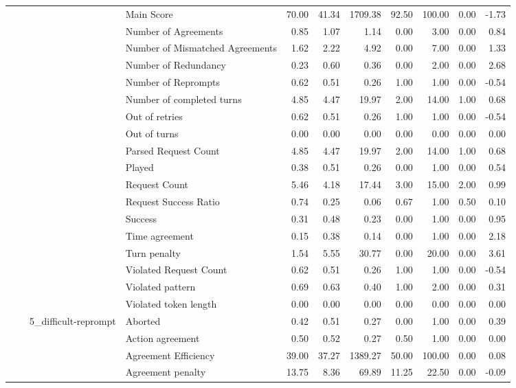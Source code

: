 \begin{tabular}{llllrrrrrrr}
 &  &  & Main Score & 70.00 & 41.34 & 1709.38 & 92.50 & 100.00 & 0.00 & -1.73 \\
 &  &  & Number of Agreements & 0.85 & 1.07 & 1.14 & 0.00 & 3.00 & 0.00 & 0.84 \\
 &  &  & Number of Mismatched Agreements & 1.62 & 2.22 & 4.92 & 0.00 & 7.00 & 0.00 & 1.33 \\
 &  &  & Number of Redundancy & 0.23 & 0.60 & 0.36 & 0.00 & 2.00 & 0.00 & 2.68 \\
 &  &  & Number of Reprompts & 0.62 & 0.51 & 0.26 & 1.00 & 1.00 & 0.00 & -0.54 \\
 &  &  & Number of completed turns & 4.85 & 4.47 & 19.97 & 2.00 & 14.00 & 1.00 & 0.68 \\
 &  &  & Out of retries & 0.62 & 0.51 & 0.26 & 1.00 & 1.00 & 0.00 & -0.54 \\
 &  &  & Out of turns & 0.00 & 0.00 & 0.00 & 0.00 & 0.00 & 0.00 & 0.00 \\
 &  &  & Parsed Request Count & 4.85 & 4.47 & 19.97 & 2.00 & 14.00 & 1.00 & 0.68 \\
 &  &  & Played & 0.38 & 0.51 & 0.26 & 0.00 & 1.00 & 0.00 & 0.54 \\
 &  &  & Request Count & 5.46 & 4.18 & 17.44 & 3.00 & 15.00 & 2.00 & 0.99 \\
 &  &  & Request Success Ratio & 0.74 & 0.25 & 0.06 & 0.67 & 1.00 & 0.50 & 0.10 \\
 &  &  & Success & 0.31 & 0.48 & 0.23 & 0.00 & 1.00 & 0.00 & 0.95 \\
 &  &  & Time agreement & 0.15 & 0.38 & 0.14 & 0.00 & 1.00 & 0.00 & 2.18 \\
 &  &  & Turn penalty & 1.54 & 5.55 & 30.77 & 0.00 & 20.00 & 0.00 & 3.61 \\
 &  &  & Violated Request Count & 0.62 & 0.51 & 0.26 & 1.00 & 1.00 & 0.00 & -0.54 \\
 &  &  & Violated pattern & 0.69 & 0.63 & 0.40 & 1.00 & 2.00 & 0.00 & 0.31 \\
 &  &  & Violated token length & 0.00 & 0.00 & 0.00 & 0.00 & 0.00 & 0.00 & 0.00 \\
\cline{3-11}
 &  & \multirow[t]{27}{*}{5_difficult-reprompt} & Aborted & 0.42 & 0.51 & 0.27 & 0.00 & 1.00 & 0.00 & 0.39 \\
 &  &  & Action agreement & 0.50 & 0.52 & 0.27 & 0.50 & 1.00 & 0.00 & 0.00 \\
 &  &  & Agreement Efficiency & 39.00 & 37.27 & 1389.27 & 50.00 & 100.00 & 0.00 & 0.08 \\
 &  &  & Agreement penalty & 13.75 & 8.36 & 69.89 & 11.25 & 22.50 & 0.00 & -0.09 \\

\end{tabular}

